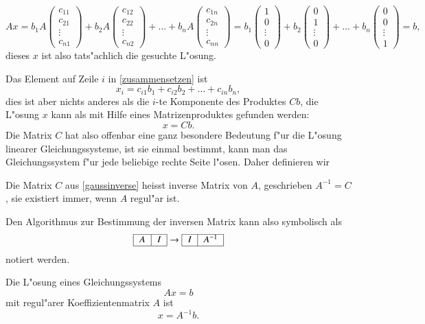 $$
Ax
=
b_1A\begin{pmatrix}c_{11}\\c_{21}\\\vdots\\c_{n1}\end{pmatrix}
+
b_2A\begin{pmatrix}c_{12}\\c_{22}\\\vdots\\c_{n2}\end{pmatrix}
+\dots+
b_nA\begin{pmatrix}c_{1n}\\c_{2n}\\\vdots\\c_{nn}\end{pmatrix}
=
b_1\begin{pmatrix}1\\0\\\vdots\\0\end{pmatrix}
+
b_2\begin{pmatrix}0\\1\\\vdots\\0\end{pmatrix}
+\dots+
b_n\begin{pmatrix}0\\0\\\vdots\\1\end{pmatrix}=b,
$$
dieses $x$ ist also tats"achlich die gesuchte L"osung.

Das Element auf Zeile $i$ in 
\ref{zusammensetzen} ist
$$
x_i=c_{i1}b_1+c_{i2}b_2+\dots+c_{in}b_n,
$$
dies ist aber nichts anderes als die $i$-te Komponente des Produktes
$Cb$, die L"osung $x$ kann als mit Hilfe eines Matrizenproduktes gefunden
werden:
$$ x = Cb.$$
Die Matrix $C$ hat also offenbar eine ganz besondere Bedeutung f"ur die
L"osung linearer Gleichungssysteme, ist sie einmal bestimmt, kann man das
Gleichungssystem f"ur jede beliebige rechte Seite l"osen. Daher definieren
wir
\begin{definition}Die Matrix $C$ aus \ref{gaussinverse} heisst inverse
Matrix von $A$, geschrieben $A^{-1}=C$, sie existiert immer, wenn $A$ regul"ar ist.
\end{definition}
Den Algorithmus zur Bestimmung der inversen Matrix kann also symbolisch
als
\begin{equation}
\begin{tabular}{|>{$}c<{$}|>{$}c<{$}|}
\hline
A&I\\
\hline
\end{tabular}
\rightarrow
\begin{tabular}{|>{$}c<{$}|>{$}c<{$}|}\hline
I&A^{-1}\\
\hline
\end{tabular}
\label{gaussinverse2}
\end{equation}
notiert werden.
\begin{satz}Die L"osung eines Gleichungssystems
\[
Ax=b
\]
mit
regul"arer Koeffizientenmatrix $A$ ist
\[
x=A^{-1}b.
\]
\end{satz}


